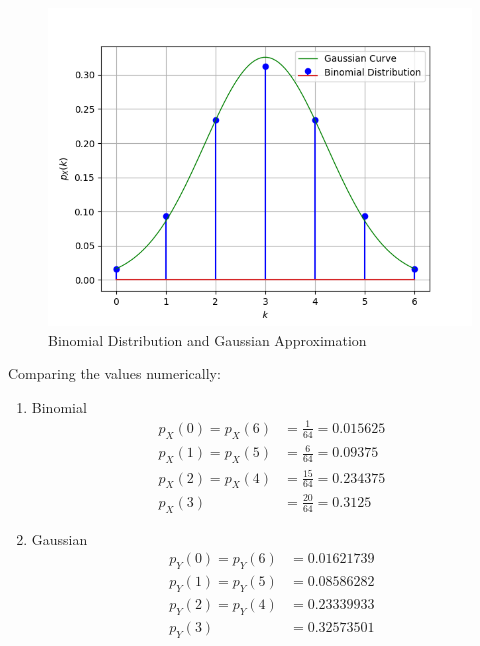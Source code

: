 \documentclass[journal,12pt,twocolumn]{IEEEtran}
\theoremstyle{remark}
\begin{document}
\begin{figure}[h]
\centering
\includegraphics[width=\columnwidth]{ncert/9/3/19/figures/PDF_and_PMF.png}
\caption{Binomial Distribution and Gaussian Approximation}
\label{fig:9.3.19}
\end{figure}
Comparing the values numerically:
\begin{enumerate}
\item Binomial
\begin{align}
	p_X(0) = p_X(6) &= \frac{1}{64} = 0.015625\\
	p_X(1) = p_X(5) &= \frac{6}{64} = 0.09375\\
	p_X(2) = p_X(4) &= \frac{15}{64} = 0.234375\\
	p_X(3) &= \frac{20}{64} = 0.3125
\end{align}
\item Gaussian
\begin{align}
        p_Y(0) = p_Y(6) &= 0.01621739\\
        p_Y(1) = p_Y(5) &= 0.08586282\\
        p_Y(2) = p_Y(4) &= 0.23339933\\
        p_Y(3) &= 0.32573501
\end{align}
\end{enumerate}
\end{document}
